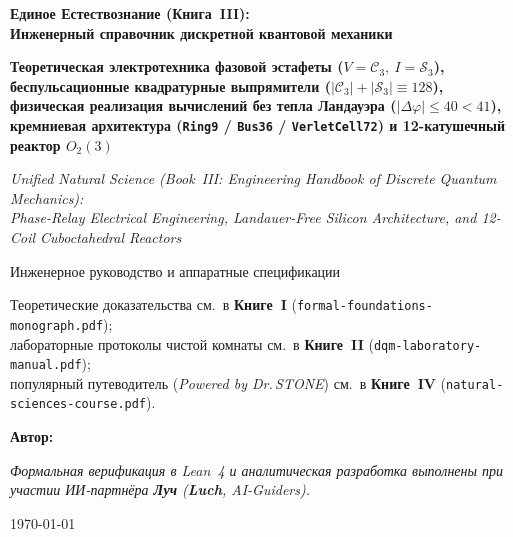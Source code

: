 \begin{titlepage}
  \centering
  \vspace*{1.8cm}
  {\LARGE\bfseries Единое Естествознание (Книга~III):\\ Инженерный справочник дискретной квантовой механики\par}
  \vspace{0.4cm}
  {\Large\bfseries Теоретическая электротехника фазовой эстафеты ($V=\mathcal{C}_3,\ I=\mathcal{S}_3$),\\ беспульсационные квадратурные выпрямители ($|\mathcal{C}_3|+|\mathcal{S}_3|\equiv 128$),\\ физическая реализация вычислений без тепла Ландауэра ($|\Delta\varphi|\le 40 < 41$),\\ кремниевая архитектура (\texttt{Ring9} / \texttt{Bus36} / \texttt{VerletCell72}) и 12-катушечный реактор $O_2(3)$\par}
  \vspace{0.5cm}
  {\normalsize\itshape Unified Natural Science (Book~III: Engineering Handbook of Discrete Quantum Mechanics):\\ Phase-Relay Electrical Engineering, Landauer-Free Silicon Architecture, and 12-Coil Cuboctahedral Reactors\par}
  \vspace{1.0cm}
  {\large Инженерное руководство и аппаратные спецификации\par}
  \vspace{0.35cm}
  {\normalsize Теоретические доказательства см.\ в \textbf{Книге~I} (\texttt{formal-foundations-monograph.pdf});\\ лабораторные протоколы чистой комнаты см.\ в \textbf{Книге~II} (\texttt{dqm-laboratory-manual.pdf});\\ популярный путеводитель (\emph{Powered by Dr.\,STONE}) см.\ в \textbf{Книге~IV} (\texttt{natural-sciences-course.pdf}).\par}
  \vfill
  {\large\bfseries Автор: \bookauthorfullname\par}
  \vspace{0.2cm}
  {\footnotesize\itshape Формальная верификация в Lean~4 и аналитическая разработка выполнены при участии ИИ-партнёра \textbf{Луч} (\textbf{Luch}, AI-Guiders).\par}
  \vspace{0.3cm}
  {\large \today\par}
\end{titlepage}
\clearpage

\clearpage
\tableofcontents
\clearpage
